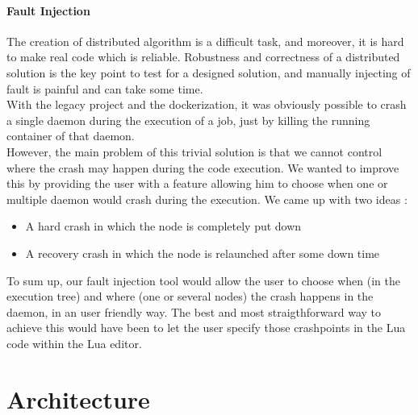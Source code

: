 \documentclass{eplmastersthesis}
\begin{document}
        \subsubsection{Fault Injection}

          The creation of distributed algorithm is a difficult task, and
          moreover, it is hard to make real code which is reliable. Robustness
          and correctness of a distributed solution is the key point to test
          for a designed solution, and manually injecting of fault is painful
          and can take some time. \\

          With the legacy project and the dockerization, it was obviously
          possible to crash a single daemon during the execution of a job, just
          by killing the running container of that daemon.\\
          However, the main problem of this trivial solution is that we cannot
          control where the crash may happen during the code execution.
          We wanted to improve this by providing the user with a feature
          allowing him to choose when one or multiple daemon would crash during
          the execution. We came up with two ideas :

          \begin{itemize}
            \item A hard crash in which the node is completely put down
            \item A recovery crash in which the node is relaunched after some
            down time
          \end{itemize}

          To sum up, our fault injection tool would allow the user to choose
          when (in the execution tree) and where (one or several nodes) the
          crash happens in the daemon, in an user friendly way. The best and
          most straigthforward way to achieve this would have been to let
          the user specify those crashpoints in the Lua code within the Lua
          editor.


  \chapter{Architecture}

\end{document}

